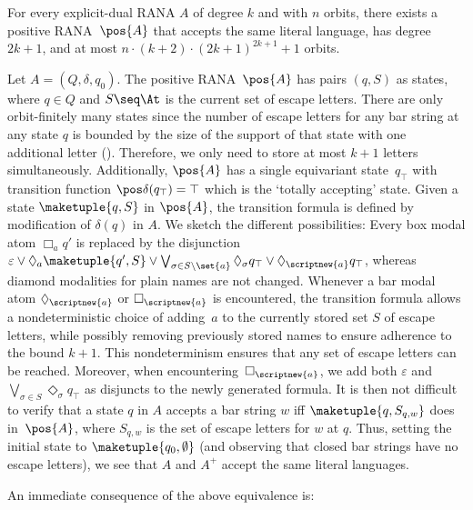 \documentclass[10pt, final, conference, a4paper, twocolumn]{IEEEtran}
\renewcommand{\enquote}[1]{`#1'}
\begin{document}
\begin{theo}\label{lem:constr02}
For every explicit-dual RANA $A$ of degree $k$ and with $n$ orbits, there exists a positive RANA~$\pos{A}$ that accepts the same literal language, has degree $2k + 1$, and at most $n \cdot (k + 2) \cdot (2k + 1)^{2k + 1} +1$ orbits. 
\end{theo}
\begin{IEEEproof}
  Let $A=(Q,\delta,q_0)$. The positive RANA~$\pos{A}$ has pairs $(q,S)$ as states, where $q\in Q$ and $S\seq \At$ is the current set of escape letters. There are only orbit-finitely many states since the number of escape letters for any
  bar string at any state $q$ is bounded by the size of the support of that state with one additional
  letter (). Therefore, we only need to store at most $k + 1$ letters
  simultaneously. Additionally, $\pos{A}$ has a single equivariant state~$q_{\top}$
  with transition function $\pos\delta(q_{\top}) = \top$ which is the \enquote{totally
  accepting} state. Given a state $\maketuple{q, S}$ in $\pos{A}$,
  the transition formula is defined by modification of $\delta(q)$ in $A$. We sketch the
  different possibilities: Every box modal atom $\Box_a q'$ is replaced by the disjunction
  $\varepsilon \vee \Diamond_a \maketuple{q',S} \vee \bigvee_{\sigma \in S \setminus \set{a}}
  \Diamond_\sigma q_{\top} \vee \Diamond_{\scriptnew{a}} q_{\top}$, whereas diamond modalities
  for plain names are not changed. Whenever a bar modal atom $\Diamond_{\scriptnew{a}}$ or
  $\Box_{\scriptnew{a}}$ is encountered, the transition formula allows a nondeterministic
  choice of adding~$a$ to the currently stored set $S$ of escape letters, while possibly
  removing previously stored names to ensure adherence to the bound $k + 1$. 
  This nondeterminism ensures that any set of escape letters can be reached. Moreover, when encountering~$\Box_{\scriptnew{a}}$, we add both $\varepsilon$
  and $\bigvee_{\sigma \in S} \Diamond_\sigma q_{\top}$ as disjuncts to the newly generated
  formula. It is
then not difficult to verify that a state $q$ in $A$ accepts a bar string $w$ iff $\maketuple{q, S_{q,w}}$
  does in~$\pos{A}$, where $S_{q,w}$ is the set of escape letters for $w$ at $q$. Thus, setting the initial state to $\maketuple{q_0, \emptyset}$ (and observing that closed bar strings have no escape letters), we see that $A$ and $A^+$ accept the same literal languages.
\end{IEEEproof}

An immediate consequence of the above equivalence is:
\end{document}

